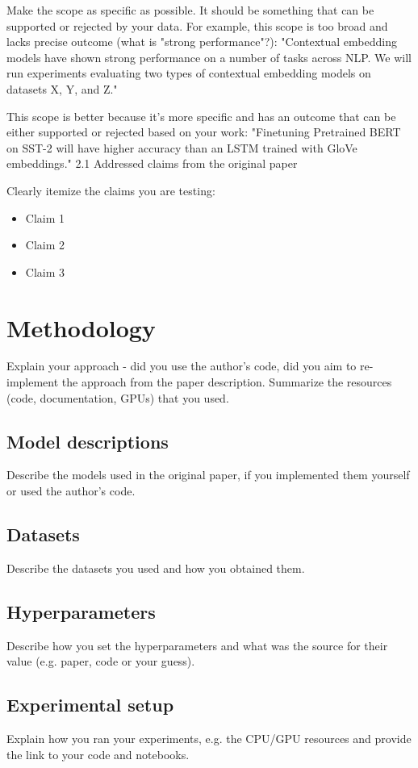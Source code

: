 \documentclass{article}
\begin{document}
Make the scope as specific as possible. It should be something that can be supported or rejected by your data. For example, this scope is too broad and lacks precise outcome (what is "strong performance"?): "Contextual embedding models have shown strong performance on a number of tasks across NLP. We will run experiments evaluating two types of contextual embedding models on datasets X, Y, and Z."

This scope is better because it's more specific and has an outcome that can be either supported or rejected based on your work: "Finetuning Pretrained BERT on SST-2 will have higher accuracy than an LSTM trained with GloVe embeddings."
2.1 Addressed claims from the original paper

Clearly itemize the claims you are testing:
\begin{itemize}
    \item Claim 1
    \item Claim 2
    \item Claim 3
\end{itemize}


\section{Methodology}

Explain your approach - did you use the author's code, did you aim to re-implement the approach from the paper description. Summarize the resources (code, documentation, GPUs) that you used. 

\subsection{Model descriptions}
Describe the models used in the original paper, if you implemented them yourself or used the author's code. 

\subsection{Datasets}
Describe the datasets you used and how you obtained them. 

\subsection{Hyperparameters}
Describe how you set the hyperparameters and what was the source for their value (e.g. paper, code or your guess). 

\subsection{Experimental setup}
Explain how you ran your experiments, e.g. the CPU/GPU resources and provide the link to your code and notebooks. 
\end{document}
